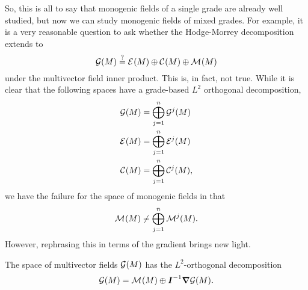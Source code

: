 So, this is all to say that monogenic fields of a single grade are already well studied, but now we can study monogenic fields of mixed grades. For example, it is a very reasonable question to ask whether the Hodge-Morrey decomposition extends to
    \begin{equation}
        \mathcal{G}(M) \stackrel{?}{=} \mathcal{E}^{}(M) \oplus \mathcal{C}^{}(M) \oplus \mathcal{M}^{}(M)
    \end{equation} 
under the multivector field inner product. This is, in fact, not true.  While it is clear that the following spaces have a grade-based $L^2$ orthogonal decomposition,
\begin{align}
    \mathcal{G}(M) &= \bigoplus_{j=1}^n \mathcal{G}^j(M)\\
    \mathcal{E}^{}(M) &= \bigoplus_{j=1}^n \mathcal{E}^{j}(M)\\
    \mathcal{C}^{}(M) &= \bigoplus_{j=1}^n \mathcal{C}^{j}(M),
\end{align}
we have the failure for the space of monogenic fields in that
\begin{equation}
    \mathcal{M}^{}(M) \neq \bigoplus_{j=1}^n \mathcal{M}^{j}(M).
\end{equation}
However, rephrasing this in terms of the gradient brings new light.
\begin{theorem}
\label{thm:monogenic_hodge}
The space of multivector fields $\mathcal{G}(M)$ has the $L^2$-orthogonal decomposition
\begin{equation}
\mathcal{G}(M) = \mathcal{M}^{}(M) \oplus \boldsymbol{I}^{-1} \boldsymbol{\nabla} \mathcal{G}(M).
\end{equation}
\end{theorem}
